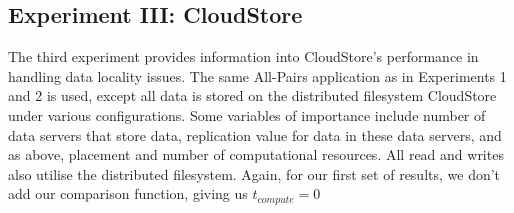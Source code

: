 \documentclass{rspublic}
\begin{document}
\subsection{Experiment III: CloudStore} 
The third experiment provides information into CloudStore's performance
in handling data locality issues. The same All-Pairs application as in
Experiments 1 and 2 is used, except all data is stored on the
distributed filesystem CloudStore under various configurations. Some
variables of importance include number of data servers that store data,
replication value for data in these data servers, and as above,
placement and number of computational resources. All read and writes
also utilise the distributed filesystem. Again, for our first set of
results, we don't add our comparison function, giving us
$t_{compute}=0$ 
\begin{figure}
\begin{center}
\end{center}
\end{figure}
\end{document}
